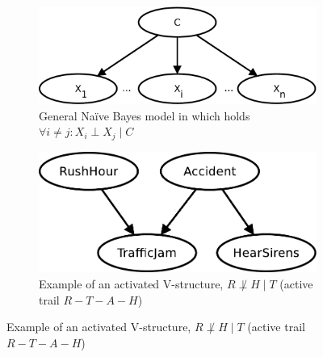 \documentclass[english,cover]{fitthesis} %
\begin{document}
\begin{center}
\begin{figure}[h]
    \begin{subfigure}[b]{0.42\linewidth}
        \includegraphics[scale=0.4]{fig/bn-naive-bayes}
        \caption{General Naïve Bayes model in which holds $\forall i \neq j: X_i \perp X_j \mid C$}
        \label{fig:bn_d-separation_a}
    \end{subfigure}
    \qquad\qquad\qquad
    \begin{subfigure}[b]{0.42\linewidth}
        \includegraphics[scale=0.4]{fig/bn-d_sep-traffic}
        \caption{Example of an activated V-structure, $R\not\perp H \mid T$ (active trail $R-T-A-H$)}
        \label{fig:bn_d-separation_traffic}
    \end{subfigure}
  

\end{figure}
\end{center}
\end{document}
